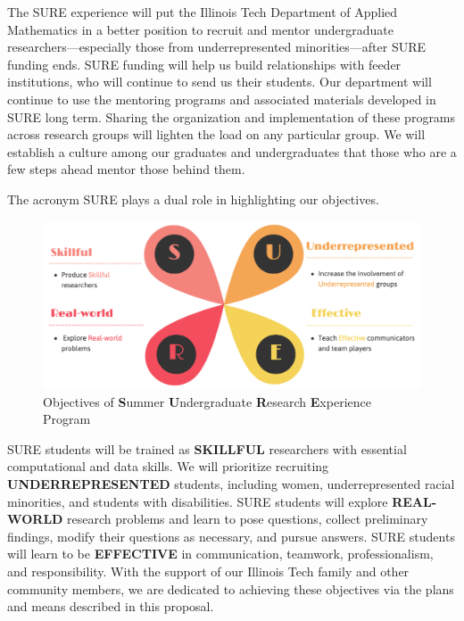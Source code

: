 \documentclass[11pt]{NSFamsart}
\begin{document}
The SURE experience will put the Illinois Tech Department of Applied Mathematics in a better position to recruit and mentor undergraduate researchers---especially those from underrepresented minorities---after SURE funding ends. SURE funding will help us build relationships with feeder institutions, who will continue to send us their students.  Our department will continue to use the mentoring programs and associated materials developed in SURE long term.  Sharing the organization and implementation of these programs across research groups will lighten the load on any particular group. We will establish a culture among our graduates and undergraduates that those who are a few steps ahead mentor those behind them.

The acronym SURE plays a dual role in highlighting our objectives.


\begin{figure}[bh]
    \centering
    \includegraphics[width = 14cm]{SURE_1_3.png}
    \caption{Objectives of {\bf S}ummer {\bf U}ndergraduate {\bf R}esearch {\bf E}xperience Program}
    \label{fig:sure_obj}
\end{figure}

SURE students will be trained as \uppercase{\textbf{skillful}} researchers with essential computational and data skills. 
We will prioritize recruiting \uppercase{\textbf{underrepresented}} students, including women, underrepresented racial minorities, and students with disabilities. 
SURE students will explore 
\uppercase{\textbf{Real-world}} research problems and learn to pose questions, collect preliminary findings, modify their questions as necessary, and pursue answers. 
SURE students will learn to 
be \uppercase{\textbf{effective}} in communication, teamwork,  professionalism, and responsibility. 
With the support of our Illinois Tech family and other community members, we are dedicated to achieving these objectives via the plans and means described in this proposal. 
\end{document}
